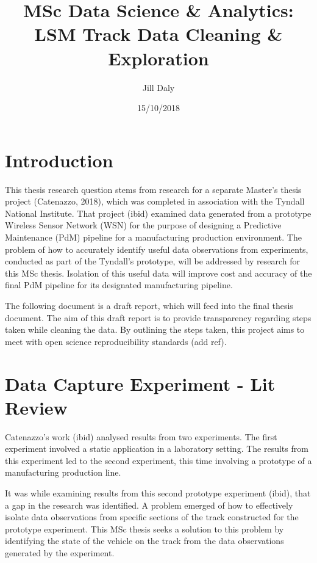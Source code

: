 \documentclass[]{article}
\title{MSc Data Science \& Analytics: LSM Track Data Cleaning \& Exploration}
\author{Jill Daly}
\date{15/10/2018}
\begin{document}
\maketitle

{
\setcounter{tocdepth}{2}
\tableofcontents
}
\newpage 
\tableofcontents 
\listoffigures
\listoftables
\newpage

\newpage

\hypertarget{introduction}{%
\section{Introduction}\label{introduction}}

This thesis research question stems from research for a separate
Master's thesis project (Catenazzo, 2018), which was completed in
association with the Tyndall National Institute. That project (ibid)
examined data generated from a prototype Wireless Sensor Network (WSN)
for the purpose of designing a Predictive Maintenance (PdM) pipeline for
a manufacturing production environment. The problem of how to accurately
identify useful data observations from experiments, conducted as part of
the Tyndall's prototype, will be addressed by research for this MSc
thesis. Isolation of this useful data will improve cost and accuracy of
the final PdM pipeline for its designated manufacturing pipeline.

The following document is a draft report, which will feed into the final
thesis document. The aim of this draft report is to provide transparency
regarding steps taken while cleaning the data. By outlining the steps
taken, this project aims to meet with open science reproducibility
standards (add ref).

\newpage

\hypertarget{data-capture-experiment---lit-review}{%
\section{Data Capture Experiment - Lit
Review}\label{data-capture-experiment---lit-review}}

Catenazzo's work (ibid) analysed results from two experiments. The first
experiment involved a static application in a laboratory setting. The
results from this experiment led to the second experiment, this time
involving a prototype of a manufacturing production line.

It was while examining results from this second prototype experiment
(ibid), that a gap in the research was identified. A problem emerged of
how to effectively isolate data observations from specific sections of
the track constructed for the prototype experiment. This MSc thesis
seeks a solution to this problem by identifying the state of the vehicle
on the track from the data observations generated by the experiment.
\end{document}
